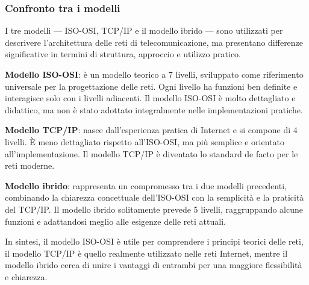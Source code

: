 \subsubsection{Confronto tra i modelli}
I tre modelli — ISO-OSI, TCP/IP e il modello ibrido — sono utilizzati per descrivere l’architettura delle reti di telecomunicazione, ma presentano differenze significative in termini di struttura, approccio e utilizzo pratico.

\textbf{Modello ISO-OSI}: è un modello teorico a 7 livelli, sviluppato come riferimento universale per la progettazione delle reti. Ogni livello ha funzioni ben definite e interagisce solo con i livelli adiacenti. Il modello ISO-OSI è molto dettagliato e didattico, ma non è stato adottato integralmente nelle implementazioni pratiche.

\textbf{Modello TCP/IP}: nasce dall’esperienza pratica di Internet e si compone di 4 livelli. È meno dettagliato rispetto all’ISO-OSI, ma più semplice e orientato all’implementazione. Il modello TCP/IP è diventato lo standard de facto per le reti moderne.

\textbf{Modello ibrido}: rappresenta un compromesso tra i due modelli precedenti, combinando la chiarezza concettuale dell’ISO-OSI con la semplicità e la praticità del TCP/IP. Il modello ibrido solitamente prevede 5 livelli, raggruppando alcune funzioni e adattandosi meglio alle esigenze delle reti attuali.

In sintesi, il modello ISO-OSI è utile per comprendere i principi teorici delle reti, il modello TCP/IP è quello realmente utilizzato nelle reti Internet, mentre il modello ibrido cerca di unire i vantaggi di entrambi per una maggiore flessibilità e chiarezza.

